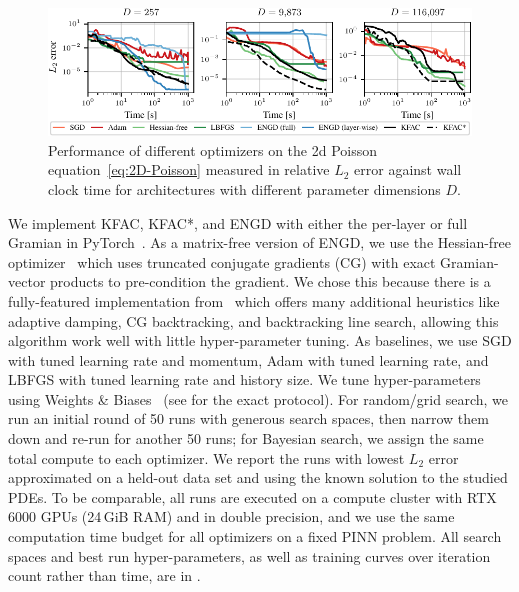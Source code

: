 \begin{figure}[t]
  \centering
  \includegraphics{../kfac_pinns_exp/exp17_groupplot_poisson2d/l2_error_over_time.pdf}
  \caption{Performance of different optimizers on the 2d Poisson equation~\eqref{eq:2D-Poisson} measured in relative $L_2$ error against wall clock time for architectures with different parameter dimensions $D$.}
  \label{fig:2D-Poisson}
\end{figure}

We implement KFAC, KFAC*, and ENGD with either the per-layer or full Gramian in PyTorch~\citep{paszke2019pytorch}.
As a matrix-free version of ENGD, we use the Hessian-free optimizer~\citep{martens2010deep} which uses truncated conjugate gradients (CG) with exact Gramian-vector products to pre-condition the gradient.
We chose this because there is a fully-featured implementation from~\citet{tatzel2022late} which offers many additional heuristics like adaptive damping, CG backtracking, and backtracking line search, allowing this algorithm work well with little hyper-parameter tuning.
As baselines, we use SGD with tuned learning rate and momentum, Adam with tuned learning rate, and LBFGS with tuned learning rate and history size.
We tune hyper-parameters using Weights \& Biases~\citep{wandb} (see  for the exact protocol).
For random/grid search, we run an initial round of 50 runs with generous search spaces, then narrow them down and re-run for another 50 runs; for Bayesian search, we assign the same total compute to each optimizer.
We report the runs with lowest $L_2$ error approximated on a held-out data set and using the known solution to the studied PDEs.
To be comparable, all runs are executed on a compute cluster with RTX 6000 GPUs (24\,GiB RAM) and in double precision, and we use the same computation time budget for all optimizers on a fixed PINN problem.
All search spaces and best run hyper-parameters, as well as training curves over iteration count rather than time, are in .

